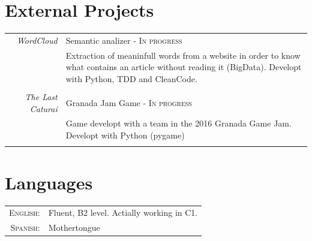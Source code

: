 \documentclass[a4paper,10pt]{article} %
\begin{document}

\section{External Projects}

\begin{tabular}{r|p{11cm}}
\emph{WordCloud} & Semantic analizer -
\textsc{In progress}
\\ 
& \footnotesize{Extraction of meaninfull words from a
website in order to know what contains an article without reading it (BigData).
Developt with Python, TDD and CleanCode.}\\
\multicolumn{2}{c}{} \\


\emph{The Last Caturai} & Granada Jam Game -
\textsc{In progress}
\\ 
& \footnotesize{Game developt with a team in the 2016 Granada Game Jam.
Developt with Python (pygame)}\\
\multicolumn{2}{c}{} \\


\end{tabular}


\section{Languages}

\begin{tabular}{rl}
\textsc{English:} & Fluent, B2 level. Actially working in C1.\\

\textsc{Spanish:} & Mothertongue\\

\end{tabular} 

\end{document}
